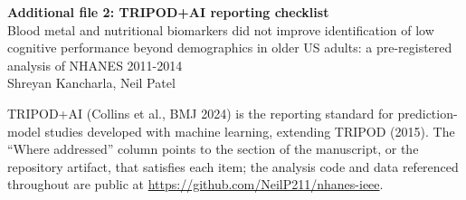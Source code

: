 \documentclass[10pt]{article}
\title{}
\date{}
\begin{document}
\begin{center}
{\large\bfseries Additional file 2: TRIPOD+AI reporting checklist}\\[2pt]
{\small Blood metal and nutritional biomarkers did not improve identification of low cognitive performance beyond demographics in older US adults: a pre-registered analysis of NHANES 2011-2014}\\[2pt]
{\small Shreyan Kancharla, Neil Patel}
\end{center}

\bigskip

TRIPOD+AI (Collins et al., BMJ 2024) is the reporting standard for prediction-model studies developed with machine learning, extending TRIPOD (2015). The ``Where addressed'' column points to the section of the manuscript, or the repository artifact, that satisfies each item; the analysis code and data referenced throughout are public at \url{https://github.com/NeilP211/nhanes-ieee}.

\footnotesize
\end{document}
